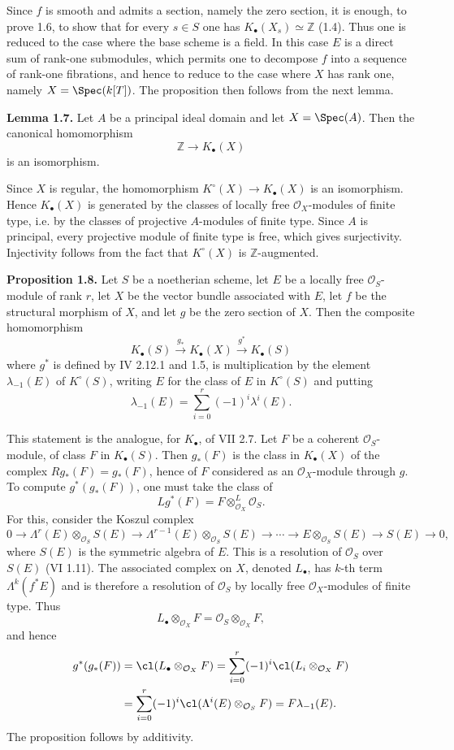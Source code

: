 Since $f$ is smooth and admits a section, namely the zero section, it is enough, to prove 1.6, to show that for every $s\in S$ one has $K_\bullet(X_s)\simeq \mathbb Z$ (1.4). Thus one is reduced to the case where the base scheme is a field. In this case $E$ is a direct sum of rank-one submodules, which permits one to decompose $f$ into a sequence of rank-one fibrations, and hence to reduce to the case where $X$ has rank one, namely $X=\Spec(k[T])$. The proposition then follows from the next lemma.

\textbf{Lemma 1.7.} Let $A$ be a principal ideal domain and let $X=\Spec(A)$. Then the canonical homomorphism
\[
 \mathbb Z\longrightarrow K_\bullet(X)
\]
is an isomorphism.

Since $X$ is regular, the homomorphism $K^\circ(X)\to K_\bullet(X)$ is an isomorphism. Hence $K_\bullet(X)$ is generated by the classes of locally free $\mathcal O_X$-modules of finite type, i.e. by the classes of projective $A$-modules of finite type. Since $A$ is principal, every projective module of finite type is free, which gives surjectivity. Injectivity follows from the fact that $K^\circ(X)$ is $\mathbb Z$-augmented.

\textbf{Proposition 1.8.} Let $S$ be a noetherian scheme, let $E$ be a locally free $\mathcal O_S$-module of rank $r$, let $X$ be the vector bundle associated with $E$, let $f$ be the structural morphism of $X$, and let $g$ be the zero section of $X$. Then the composite homomorphism
\[
 K_\bullet(S)\xrightarrow{g_*}K_\bullet(X)\xrightarrow{g^*}K_\bullet(S)
\]
where $g^*$ is defined by IV 2.12.1 and 1.5, is multiplication by the element $\lambda_{-1}(E)$ of $K^\circ(S)$, writing $E$ for the class of $E$ in $K^\circ(S)$ and putting
\[
 \lambda_{-1}(E)=\sum_{i=0}^r(-1)^i\lambda^i(E).
\]

This statement is the analogue, for $K_\bullet$, of VII 2.7. Let $F$ be a coherent $\mathcal O_S$-module, of class $F$ in $K_\bullet(S)$. Then $g_*(F)$ is the class in $K_\bullet(X)$ of the complex $Rg_*(F)=g_*(F)$, hence of $F$ considered as an $\mathcal O_X$-module through $g$. To compute $g^*(g_*(F))$, one must take the class of
\[
 Lg^*(F)=F\otimes^L_{\mathcal O_X}\mathcal O_S.
\]
For this, consider the Koszul complex
\[
0\longrightarrow \Lambda^r(E)\otimes_{\mathcal O_S}S(E)\longrightarrow
\Lambda^{r-1}(E)\otimes_{\mathcal O_S}S(E)\longrightarrow \cdots\longrightarrow
E\otimes_{\mathcal O_S}S(E)\longrightarrow S(E)\longrightarrow 0,
\]
where $S(E)$ is the symmetric algebra of $E$. This is a resolution of $\mathcal O_S$ over $S(E)$ (VI 1.11). The associated complex on $X$, denoted $L_\bullet$, has $k$-th term $\Lambda^k(f^*E)$ and is therefore a resolution of $\mathcal O_S$ by locally free $\mathcal O_X$-modules of finite type. Thus
\[
 L_\bullet\otimes_{\mathcal O_X}F=\mathcal O_S\otimes_{\mathcal O_X}F,
\]
and hence
\[
\begin{aligned}
 g^*(g_*(F))
 &=\cl(L_\bullet\otimes_{\mathcal O_X}F)
   =\sum_{i=0}^r(-1)^i\cl(L_i\otimes_{\mathcal O_X}F)\\
 &=\sum_{i=0}^r(-1)^i\cl(\Lambda^i(E)\otimes_{\mathcal O_S}F)
   =F\lambda_{-1}(E).
\end{aligned}
\]
The proposition follows by additivity.

